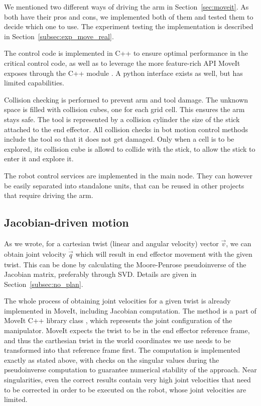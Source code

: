 \documentclass[buriama8_dp.tex]{subfiles}
\begin{document}
We mentioned two different ways of driving the arm in Section~\ref{sec:moveit}. As both have their pros and cons, we implemented both of them and tested them to decide which one to use. The experiment testing the implementation is described in Section~\ref{subsec:exp_move_real}.

The control code is implemented in C++ to ensure optimal performance in the critical control code, as well as to leverage the more feature-rich API MoveIt exposes through the C++ module . A python interface exists as well, but has limited capabilities.

Collision checking is performed to prevent arm and tool damage. The unknown space is filled with collision cubes, one for each grid cell. This ensures the arm stays safe. The tool is represented by a collision cylinder the size of the stick attached to the end effector. All collision checks in bot motion control methods include the tool so that it does not get damaged. Only when a cell is to be explored, its collision cube is allowd to collide with the stick, to allow the stick to enter it and explore it.

The robot control services are implemented in the main node. They can however be easily separated into standalone units, that can be reused in other projects that require driving the arm.

\subsection{Jacobian-driven motion}
\label{subsec:impl_drv_jacob}

As we wrote, for a cartesian twist (linear and angular velocity) vector \(\vec v\), we can obtain joint velocity \(\dot{\vec q}\) which will result in end effector movement with the given twist. This can be done by calculating the Moore-Penrose pseudoinverse of the Jacobian matrix, preferably through SVD. Details are given in Section~\ref{subsec:no_plan}.

The whole process of obtaining joint velocities for a given twist is already implemented in MoveIt, including Jacobian computation. The method is a part of MoveIt C++ library class , which represents the joint configuration of the manipulator. MoveIt expects the twist to be in the end effector reference frame, and thus the carthesian twist in the world coordinates we use needs to be transformed into that reference frame first. The computation is implemented exactly as stated above, with checks on the singular values during the pseudoinverse computation to guarantee numerical stability of the approach. Near singularities, even the correct results contain very high joint velocities that need to be corrected in order to be executed on the robot, whose joint velocities are limited.
\end{document}
